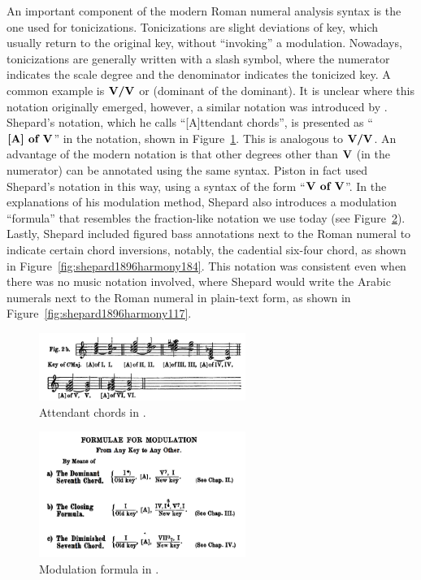 An important component of the modern Roman numeral analysis syntax is the one used for tonicizations.
Tonicizations are slight deviations of key, which usually return to the original key, without ``invoking'' a modulation.
Nowadays, tonicizations are generally written with a slash symbol, where the numerator indicates the scale degree and the denominator indicates the tonicized key.
A common example is $\textbf{V/V}\relax\relax$ or (dominant of the dominant).
It is unclear where this notation originally emerged, however, a similar notation was introduced by \textcite{shepard1889how}.
Shepard's notation, which he calls ``[A]ttendant chords'', is presented as ``$\textbf{[A] of V}\relax\relax$'' in the notation, shown in Figure~\ref{fig:shepard1889how005}.
This is analogous to $\textbf{V/V}\relax\relax$.
An advantage of the modern notation is that other degrees other than $\textbf{V}\relax\relax$ (in the numerator) can be annotated using the same syntax.
Piston in fact used Shepard's notation in this way, using a syntax of the form ``$\textbf{V of V}\relax\relax$''.
In the explanations of his modulation method, Shepard also introduces a modulation ``formula'' that resembles the fraction-like notation we use today (see Figure~\ref{fig:shepard1889how010}).
Lastly, Shepard included figured bass annotations next to the Roman numeral to indicate certain chord inversions, notably, the cadential six-four chord, as shown in Figure~\ref{fig:shepard1896harmony184}.
This notation was consistent even when there was no music notation involved, where Shepard would write the Arabic numerals next to the Roman numeral in plain-text form, as shown in Figure~\ref{fig:shepard1896harmony117}.

\begin{figure}[h!]
    \centering
    \includegraphics[width=0.6\textwidth]{figures/chapter/2/primary_sources/shepard1889how005.png}
    \caption{Attendant chords in \textcite{shepard1889how}.}
    \label{fig:shepard1889how005}
\end{figure}

\begin{figure}[h!]
    \centering
    \includegraphics[width=0.6\textwidth]{figures/chapter/2/primary_sources/shepard1889how010.png}
    \caption{Modulation formula in \textcite{shepard1889how}.}
    \label{fig:shepard1889how010}
\end{figure}

